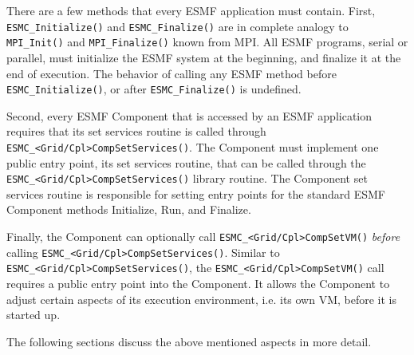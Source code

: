 %

There are a few methods that every ESMF application must contain. First,
{\tt ESMC\_Initialize()} and {\tt ESMC\_Finalize()} are in complete analogy 
to {\tt MPI\_Init()} and {\tt MPI\_Finalize()} known from MPI. All ESMF
programs, serial or parallel, must initialize the ESMF system at the beginning,
and finalize it at the end of execution. The behavior of calling any
ESMF method before {\tt ESMC\_Initialize()}, or after {\tt ESMC\_Finalize()}
is undefined.

Second, every ESMF Component that is accessed by an ESMF application requires
that its set services routine is called through
{\tt ESMC\_<Grid/Cpl>CompSetServices()}. The Component must implement
one public entry point, its set services routine, that can be called
through the {\tt ESMC\_<Grid/Cpl>CompSetServices()} library routine. The
Component set services routine is responsible for setting entry points
for the standard ESMF Component methods Initialize, Run, and Finalize.

Finally, the Component can optionally call {\tt ESMC\_<Grid/Cpl>CompSetVM()}
{\em before} calling
{\tt ESMC\_<Grid/Cpl>CompSetServices()}. Similar to 
{\tt ESMC\_<Grid/Cpl>CompSetServices()}, the 
\newline
{\tt ESMC\_<Grid/Cpl>CompSetVM()}
call requires a public entry point into the Component. It allows the Component
to adjust certain aspects of its execution environment, i.e. its own VM, before
it is started up.

The following sections discuss the above mentioned aspects in more detail.
